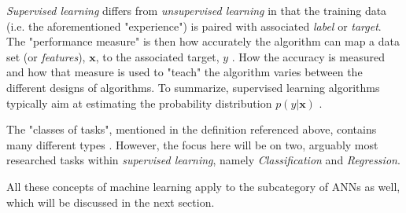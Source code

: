 \documentclass[../main.tex]{subfiles}
\begin{document}
\textit{Supervised learning} differs from \textit{unsupervised learning} in that the training data (i.e. the aforementioned "experience") is paired with associated \textit{label} or \textit{target}.
The "performance measure" is then how accurately the algorithm can map a data set (or \textit{features}), $\mathbf{x}$, to the associated target, $y$ \cite{Goodfellow2016}.
How the accuracy is measured and how that measure is used to "teach" the algorithm varies between the different designs of algorithms.
To summarize, supervised learning algorithms typically aim at estimating the probability distribution $p(y | \mathbf{x})$ \cite{Goodfellow2016}.

The "classes of tasks", mentioned in the definition referenced above, contains many different types \cite{Goodfellow2016}.
However, the focus here will be on two, arguably most researched tasks within \textit{supervised learning}, namely \textit{Classification} and \textit{Regression}.

All these concepts of machine learning apply to the subcategory of \acp{ANN} as well, which will be discussed in the next section.


\end{document}
